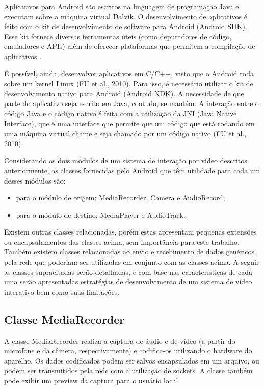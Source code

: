 \documentclass{acm_proc_article-sp}
\begin{document}
Aplicativos para Android são escritos na linguagem de programação Java e executam sobre a máquina virtual Dalvik. O desenvolvimento de aplicativos é feito com o kit de desenvolvimento de software para Android (Android SDK). Esse kit fornece diversas ferramentas úteis (como depuradores de código, emuladores e APIs) além de oferecer plataformas que permitem a compilação de aplicativos \cite{ableson_2009}. 

É possível, ainda, desenvolver aplicativos em C/C++, visto que o Android roda sobre um kernel Linux (FU et al., 2010). Para isso, é necessário utilizar o kit de desenvolvimento nativo para Android (Android NDK). A necessidade de que parte do aplicativo seja escrito em Java, contudo, se mantém. A interação entre o código Java e o código nativo é feita com a utilização da JNI (Java Native Interface), que é uma interface que permite que um código que está rodando em uma máquina virtual chame e seja chamado por um código nativo (FU et al., 2010).

Considerando os dois módulos de um sistema de interação por vídeo descritos anteriormente, as classes fornecidas pelo Android que têm utilidade para cada um desses módulos são:
\begin{itemize}
 \item para o módulo de origem: MediaRecorder, Camera e AudioRecord;
 \item para o módulo de destino: MediaPlayer e AudioTrack.
\end{itemize}

Existem outras classes relacionadas, porém estas apresentam pequenas extensões ou encapsulamentos das classes acima, sem importância para este trabalho. Também existem classes relacionadas ao envio e recebimento de dados genéricos pela rede que poderiam ser utilizadas em conjunto com as classes acima. A seguir as classes supracitadas serão detalhadas, e com base nas características de cada uma serão apresentadas estratégias de desenvolvimento de um sistema de vídeo interativo bem como suas limitações.

\subsection{Classe MediaRecorder}
A classe MediaRecorder realiza a captura de áudio e de vídeo (a partir do microfone e da câmera, respectivamente) e codifica-os utilizando o hardware do aparelho. Os dados codificados podem ser salvos encapsulados em um arquivo, ou podem ser transmitidos pela rede com a utilização de sockets. A classe também pode exibir um preview da captura para o usuário local.
\end{document}
